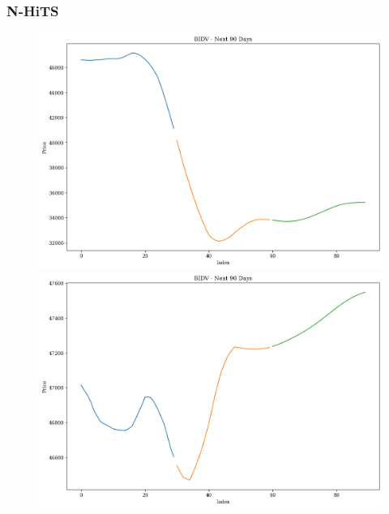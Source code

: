 \subsubsection{N-HiTS}
\begin{figure}[H]
    \centering
    \begin{minipage}{0.15\textwidth}
    \centering
    \includegraphics[width=1\textwidth]{resources/chapter-5/newdata1/predicted/BIDV_N-HiTS_7-3_90Days.png}
    \end{minipage}
    \hfill
    \begin{minipage}{0.15\textwidth}
    \centering
    \includegraphics[width=1\textwidth]{resources/chapter-5/newdata1/predicted/BIDV_N-HiTS_8-2_90Days.png}
    \end{minipage}
    \hfill
        \begin{minipage}{0.15\textwidth}
    \centering

\end{minipage}
\end{figure}
